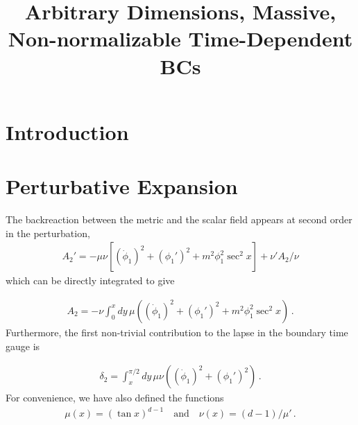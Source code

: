 \documentclass[letterpaper,11pt]{article}
\title{Arbitrary Dimensions, Massive, Non-normalizable Time-Dependent BCs}
\begin{document}
\maketitle
\flushbottom
\newpage


\section{Introduction}


\section{Perturbative Expansion}

The backreaction between the metric and the scalar field appears at second order in the perturbation,
\begin{align}
A_2' = - \mu \nu \left[ (\dot \phi_1 )^2 + (\phi_1')^2 + m^2 \phi_1^2 \sec^2 x \right] + \nu' A_2 / \nu
\end{align}
which can be directly integrated to give

\begin{align}
A_2 = -\nu \int^x_0 dy \, \mu \left( (\dot \phi_1 )^2 + (\phi_1')^2 + m^2 \phi_1^2 \sec^2 x \right) \, .
\end{align}
Furthermore, the first non-trivial contribution to the lapse in the boundary time gauge is

\begin{align}
\delta_2 = \int^{\pi/2}_x dy \, \mu \nu \left(  (\dot \phi_1 )^2 + (\phi_1')^2 \right) \, .
\end{align}
For convenience, we have also defined the functions
\begin{align}
\mu (x) = \left( \tan x \right)^{d-1} \quad \text{and} \quad \nu(x) = (d-1) / \mu ' \, .
\end{align}
\end{document}
